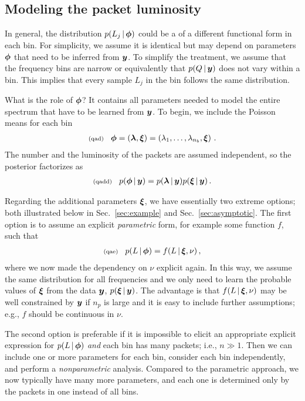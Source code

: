 \documentclass[11pt]{article}
\newcommand{\fred}[1]{\todo[color=orange!40,inline]{#1}} %
\newcommand{\lleq}[1]{\label{#1} }
\renewcommand{\lleq}[1]{\label{#1} {\scriptstyle {\rm (#1)}} \hspace*{2ex} }
\newcommand{\cond}{\,|\,}
\newcommand{\refsec}[1]{Sec.~\ref{sec:#1}}
\newcommand{\npack}{{n_p}}
\newcommand{\Lumtot}{Q}
\newcommand{\Lum}{L}
\begin{document}

\subsection{Modeling the packet luminosity} \label{sec:pack-lum}

In general, the distribution $p(\Lum_j \cond \bmphi)$ could be a of a
different functional form in each bin. For simplicity, we assume it is
identical but may depend on parameters ${\bm{\phi}}$ that need to be
inferred from ${\bm{y}}$.  To simplify the treatment, we assume that the
frequency bins are narrow or equivalently that $p(\Lumtot \cond \bmy)$
does not vary within a bin. This implies that every sample $\Lum_j$ in
the bin follows the same distribution.

What is the role of ${\bm{\phi}}$? It contains all parameters needed to
model the entire spectrum that have to be learned from ${\bm{y}}$. To
begin, we include the Poisson means for each bin
\begin{align}
  \lleq{qad} \bmphi = \left( \bmlambda, \bmxi \right) = \left(
    {\lambda_1,\dotsc,\lambda_{n_b}}, \bmxi \right)\,.
\end{align}
\fred{How }
The number and the luminosity of the packets are assumed independent,
so the posterior factorizes as
\begin{align}
  \lleq{qadd}
  p(\bmphi \cond \bmy) = p(\bmlambda \cond \bmy) p(\bmxi \cond \bmy) \,.
\end{align}

Regarding the additional parameters ${\bm{\xi}}$, we have essentially two
extreme options; both illustrated below in \refsec{example} and
\refsec{asymptotic}. The first option is to assume an explicit
\emph{parametric} form, for example some function $f$, such that
\begin{align}
  \lleq{qae}
  p(\Lum \cond \bmphi) = f(\Lum \cond \bmxi, \nu) \,,
\end{align}
where we now made the dependency on $\nu$ explicit again.  In this
way, we assume the same distribution for all frequencies and we only
need to learn the probable values of ${\bm{\xi}}$ from the data ${\bm{y}}$,
$p(\bmxi \cond \bmy)$. The advantage is that $f(\Lum \cond \bmxi, \nu)$ may
be well constrained by ${\bm{y}}$ if $\npack$ is large and it is easy to
include further assumptions; e.g., $f$ should be continuous in $\nu$.

The second option is preferable if it is impossible to elicit an
appropriate explicit expression for $p(\Lum \cond \bmphi)$ \emph{and}
each bin has many packets; i.e., $n \gg 1$. Then we can include one or
more parameters for each bin, consider each bin independently, and
perform a \emph{nonparametric} analysis. Compared to the parametric
approach, we now typically have many more parameters, and each one is
determined only by the packets in one instead of all bins.
\end{document}
